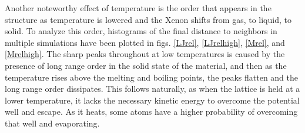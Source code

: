 \documentclass[12pt]{article}
\begin{document}
Another noteworthy effect of temperature is the order that appears in the structure as temperature is lowered and the Xenon shifts from gas, to liquid, to solid.  To analyze this order, histograms of the final distance to neighbors in multiple simulations have been plotted in figs. \ref{LJrel}, \ref{LJrelhigh}, \ref{Mrel}, and \ref{Mrelhigh}.  The sharp peaks throughout at low temperatures is caused by the presence of long range order in the solid state of the material, and then as the temperature rises above the melting and boiling points, the peaks flatten and the long range order dissipates.  This follows naturally, as when the lattice is held at a lower temperature, it lacks the necessary kinetic energy to overcome the potential well and escape.  As it heats, some atoms have a higher probability of overcoming that well and evaporating.
\end{document}
